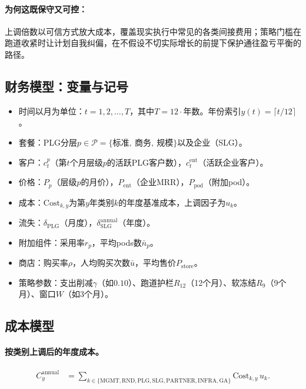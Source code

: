 \documentclass[11pt, a4paper, oneside]{article}
\begin{document}
\paragraph{为何这既保守又可控：}
上调倍数以可信方式放大成本，覆盖现实执行中常见的各类间接费用；策略门槛在跑道收紧时让计划自我纠偏，在不假设不切实际增长的前提下保护通往盈亏平衡的路径。

\subsection{财务模型：变量与记号}
\begin{itemize}
  \item 时间以月为单位：$t = 1,2,\dots,T$，其中$T = 12 \cdot \text{年数}$。年份索引$y(t) = \lceil t/12 \rceil$。
  \item 套餐：PLG分层$p \in \mathcal{P}=\{\text{标准},\ \text{商务},\ \text{规模}\}$以及企业（SLG）。
  \item 客户：$c^p_t$（第$t$个月层级$p$的活跃PLG客户数），$c^{\mathrm{ent}}_t$（活跃企业客户）。
  \item 价格：$P_p$（层级$p$的月价），$P_{\mathrm{ent}}$（企业MRR），$P_{\mathrm{pod}}$（附加pod）。
  \item 成本：$\mathrm{Cost}_{k,y}$为第$y$年类别$k$的年度基准成本，上调因子为$u_k$。
  \item 流失：$\delta_{\mathrm{PLG}}$（月度），$\delta^{\mathrm{annual}}_{\mathrm{SLG}}$（年度）。
  \item 附加组件：采用率$r_p$，平均pods数$\bar{n}_p$。
  \item 商店：购买率$\rho$，人均购买次数$\bar{u}$，平均售价$P_{\mathrm{store}}$。
  \item 策略参数：支出削减$\gamma$（如$0.10$）、跑道护栏$R_{12}$（12个月）、软冻结$R_{9}$（9个月）、窗口$W$（如$3$个月）。
\end{itemize}

\newpage
\subsection{成本模型}
\paragraph{按类别上调后的年度成本。}
\begin{align}
C^{\mathrm{annual}}_y 
  &= \sum_{k \in \{\mathrm{MGMT},\mathrm{RND},\mathrm{PLG},\mathrm{SLG},\mathrm{PARTNER},\mathrm{INFRA},\mathrm{GA}\}}
     \mathrm{Cost}_{k,y}\, u_k.
\end{align}
\end{document}
